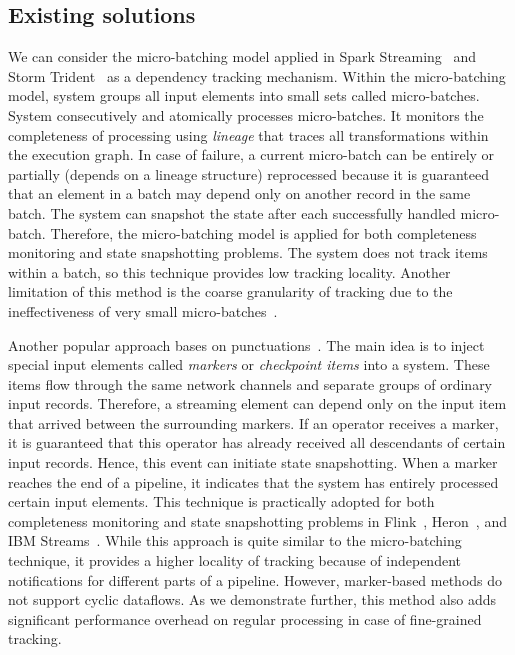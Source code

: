 \subsection{Existing solutions}
We can consider the micro-batching model applied in Spark Streaming~\cite{Zaharia:2012:DSE:2342763.2342773} and Storm Trident~\cite{apache:storm:trident} as a dependency tracking mechanism. Within the micro-batching model, system groups all input elements into small sets called micro-batches. System consecutively and atomically processes micro-batches. It monitors the completeness of processing using {\em lineage} that traces all transformations within the execution graph. In case of failure, a current micro-batch can be entirely or partially (depends on a lineage structure) reprocessed because it is guaranteed that an element in a batch may depend only on another record in the same batch. The system can snapshot the state after each successfully handled micro-batch. Therefore, the micro-batching model is applied for both completeness monitoring and state snapshotting problems. The system does not track items within a batch, so this technique provides low tracking locality. Another limitation of this method is the coarse granularity of tracking due to the ineffectiveness of very small micro-batches~\cite{Zaharia:2012:DSE:2342763.2342773}.

Another popular approach bases on punctuations~\cite{Tucker:2003:EPS:776752.776780}. The main idea is to inject special input elements called {\em markers} or {\em checkpoint items} into a system. These items flow through the same network channels and separate groups of ordinary input records. Therefore, a streaming element can depend only on the input item that arrived between the surrounding markers. If an operator receives a marker, it is guaranteed that this operator has already received all descendants of certain input records. Hence, this event can initiate state snapshotting. When a marker reaches the end of a pipeline, it indicates that the system has entirely processed certain input elements. This technique is practically adopted for both completeness monitoring and state snapshotting problems in Flink~\cite{Carbone:2017:SMA:3137765.3137777}, Heron~\cite{Kulkarni:2015:THS:2723372.2742788}, and IBM Streams~\cite{jacques2016consistent}. While this approach is quite similar to the micro-batching technique, it provides a higher locality of tracking because of independent notifications for different parts of a pipeline. However, marker-based methods do not support cyclic dataflows. As we demonstrate further, this method also adds significant performance overhead on regular processing in case of fine-grained tracking.

